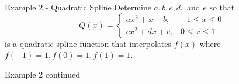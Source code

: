 \documentclass[12pt]{beamer}
\begin{document}
\begin{frame}{Example 2 - Quadratic Spline}
Determine $a,b,c,d,$ and $e$ so that
\[
Q(x) = \left\{
\begin{array}{ll}
      ax^2+x+b, & -1 \leq x\leq 0 \\
     cx^2+dx+e, & 0 \leq x\leq 1 
\end{array}
\right. \]
is a quadratic spline function that interpolates $f(x)$ where $f(-1)=1, f(0)=1,f(1)=1$.
\vspace{2 in}
\end{frame}

\begin{frame}{Example 2 continued}

\end{frame}
\end{document}
